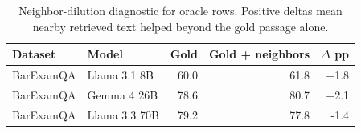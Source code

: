 \begin{table}[H]
\centering
\caption{Neighbor-dilution diagnostic for oracle rows. Positive deltas mean nearby retrieved text helped beyond the gold passage alone.}
\label{tab:neighbor_dilution}
\footnotesize
\begin{tabular}{llrrr}
\toprule
Dataset & Model & Gold & Gold + neighbors & $\Delta$ pp \\
\midrule
BarExamQA & Llama 3.1 8B & 60.0 & 61.8 & +1.8 \\
BarExamQA & Gemma 4 26B & 78.6 & 80.7 & +2.1 \\
BarExamQA & Llama 3.3 70B & 79.2 & 77.8 & -1.4 \\
\bottomrule
\end{tabular}
\end{table}
